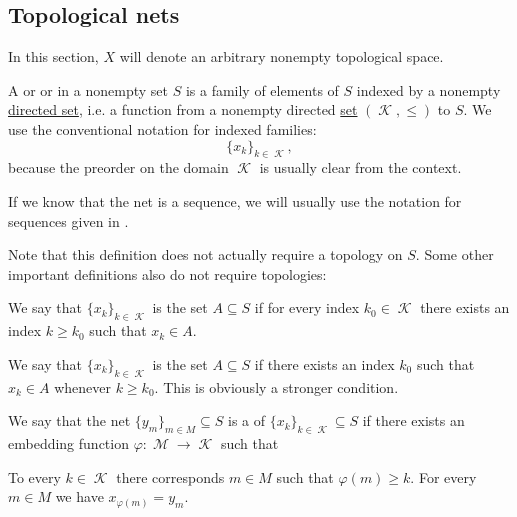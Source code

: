 \subsection{Topological nets}\label{subsec:topological_nets}

In this section, \( X \) will denote an arbitrary nonempty topological space.

\begin{definition}\label{def:topological_net}
  A  or  or  in a nonempty set \( S \) is a family of elements of \( S \) indexed by a nonempty \hyperref[def:cartesian_product/indexed_family]{directed set}, i.e. a function from a nonempty directed \hyperref[def:directed_set]{set} \( (\mscrK, \leq) \) to \( S \). We use the conventional notation for indexed families:
  \begin{equation*}
    \{ x_k \}_{k \in \mscrK},
  \end{equation*}
  because the preorder on the domain \( \mscrK \) is usually clear from the context.

  If we know that the net is a sequence, we will usually use the notation for sequences given in .

  Note that this definition does not actually require a topology on \( S \). Some other important definitions also do not require topologies:
  \begin{thmenum}
     We say that \( \{ x_k \}_{k \in \mscrK} \) is  the set \( A \subseteq S \) if for every index \( k_0 \in \mscrK \) there exists an index \( k \geq k_0 \) such that \( x_k \in A \).

     We say that \( \{ x_k \}_{k \in \mscrK} \) is  the set \( A \subseteq S \) if there exists an index \( k_0 \) such that \( x_k \in A \) whenever \( k \geq k_0 \). This is obviously a stronger condition.

    We say that the net \( \{ y_m \}_{m \in M} \subseteq S \) is a  of \( \{ x_k \}_{k \in \mscrK} \subseteq S \) if there exists an embedding function \( \varphi: \mscrM \to \mscrK \) such that
    \begin{thmenum}
       To every \( k \in \mscrK \) there corresponds \( m \in M \) such that \( \varphi(m) \geq k \).
       For every \( m \in M \) we have \( x_{\varphi(m)} = y_m \).
    \end{thmenum}
  \end{thmenum}
\end{definition}

